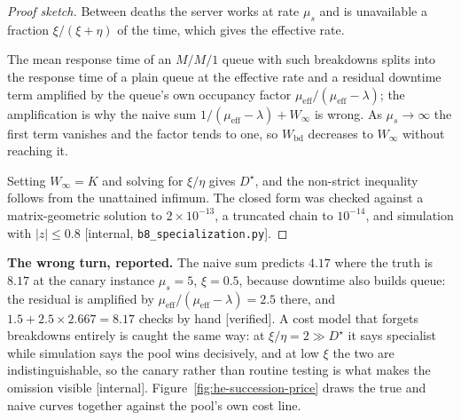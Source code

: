 \documentclass[11pt,a4paper]{article}
\theoremstyle{definition}
\theoremstyle{definition}
\theoremstyle{remark}
\begin{document}
\begin{proof}[Proof sketch]
\setlength{\parskip}{4pt plus 1pt}
Between deaths the server works at rate $\mu_s$ and is unavailable a fraction
$\xi/(\xi+\eta)$ of the time, which gives the effective rate. 

The mean response
time of an $M/M/1$ queue with such breakdowns splits into the response time of a
plain queue at the effective rate and a residual downtime term amplified by the
queue's own occupancy factor $\mu_{\mathrm{eff}}/(\mu_{\mathrm{eff}}-\lambda)$;
the amplification is why the naive sum
$1/(\mu_{\mathrm{eff}}-\lambda)+W_\infty$ is wrong. As $\mu_s\to\infty$ the
first term vanishes and the factor tends to one, so $W_{\mathrm{bd}}$ decreases
to $W_\infty$ without reaching it. 

Setting $W_\infty=K$ and solving for
$\xi/\eta$ gives $D^\star$, and the non-strict inequality follows from the
unattained infimum. The closed form was checked against a matrix-geometric
solution to $2\times10^{-13}$, a truncated chain to $10^{-14}$, and simulation
with $|z|\le0.8$ [internal, \texttt{b8\_specialization.py}].
\end{proof}

\ifpdmargincolumn\pddowntimebars\fi
\noindent\textbf{The wrong turn, reported.} The naive sum predicts $4.17$
where the truth is $8.17$ at the canary instance $\mu_s=5$, $\xi=0.5$, because
downtime also builds queue: the residual is amplified by
$\mu_{\mathrm{eff}}/(\mu_{\mathrm{eff}}-\lambda)=2.5$ there, and
$1.5+2.5\times2.667=8.17$ checks by hand [verified]. A cost model that forgets
breakdowns entirely is caught the same way: at $\xi/\eta=2\gg D^\star$ it says
specialist while simulation says the pool wins decisively, and at low $\xi$ the
two are indistinguishable, so the canary rather than routine testing is what
makes the omission visible [internal]. Figure~\ref{fig:he-succession-price}
draws the true and naive curves together against the pool's own cost line.
\end{document}
